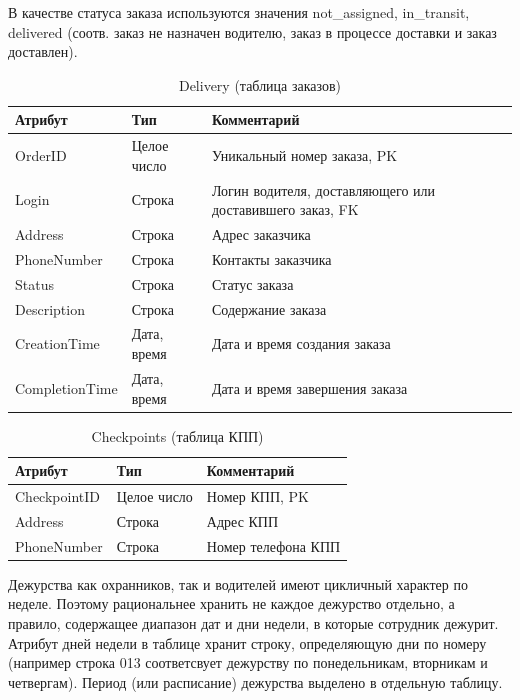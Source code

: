 В качестве статуса заказа используются значения not\_assigned, in\_transit, delivered (соотв. заказ не назначен водителю, заказ в процессе доставки и заказ доставлен).
\begin{table}[h!] 
	\begin{center}
		\caption{Delivery (таблица заказов)}
		\label{del_table}
		\begin{tabular}{| p{3.8cm} | p{3cm} | p{7.2cm} |}
			\hline
			\textbf{Атрибут}		&	\textbf{Тип}		& \textbf{Комментарий} \\
			\hline
			OrderID		&	Целое число	&	Уникальный номер заказа, PK \\ \hline
			Login 		&	Строка		&	Логин водителя, доставляющего или доставившего заказ, FK \\ \hline
			Address 	&	Строка 		&	Адрес заказчика \\ \hline
			PhoneNumber	&	Строка 		&	Контакты заказчика \\ \hline
			Status 		& 	Строка		&	Статус заказа \\ \hline
			Description	& 	Строка		&	Содержание заказа \\ \hline
			CreationTime	& Дата, время	&	Дата и время создания заказа \\ \hline
			CompletionTime	& Дата, время	&	Дата и время завершения заказа \\ \hline
		\end{tabular}
	\end{center}
\end{table}

\begin{table}[h!] 
	\begin{center}
		\caption{Checkpoints (таблица КПП)}
		\label{checkp_table}
		\begin{tabular}{| p{3.8cm} | p{3cm} | p{7.2cm} |}
			\hline
			\textbf{Атрибут}		&	\textbf{Тип}		& \textbf{Комментарий} \\
			\hline
			CheckpointID	&	Целое число	&	Номер КПП, PK \\ \hline
			Address			&	Строка		&	Адрес КПП \\ \hline
			PhoneNumber		&	Строка		&	Номер телефона КПП \\ \hline
		\end{tabular}
	\end{center}
\end{table}


Дежурства как охранников, так и водителей имеют цикличный характер по неделе. Поэтому рациональнее хранить не каждое дежурство отдельно, а правило, содержащее диапазон дат и дни недели, в которые сотрудник дежурит. Атрибут дней недели в таблице хранит строку, определяющую дни по номеру (например строка 013 соответсвует дежурству по понедельникам, вторникам и четвергам). Период (или расписание) дежурства выделено в отдельную таблицу.

